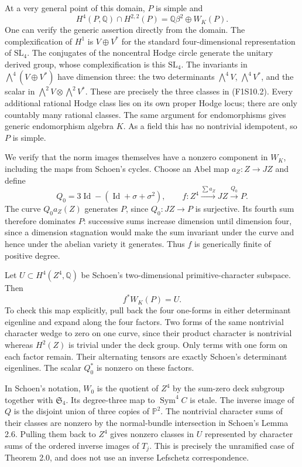 At a very general point of this domain, $P$ is simple and
\[
 H^4(P,\mathbb Q)\cap H^{2,2}(P)
                     =\mathbb Q\beta^2\oplus W_K(P).
 \tag{F1S10.2}
\]
One can verify the generic assertion directly from the domain.
The complexification of $H^1$ is $V\oplus V^*$ for the standard
four-dimensional representation of $\mathrm{SL}_4$.
The conjugates of the noncentral Hodge circle generate the
unitary derived group, whose complexification is this
$\mathrm{SL}_4$. The invariants in
$\bigwedge^4(V\oplus V^*)$ have dimension three: the two
determinants $\bigwedge^4V$, $\bigwedge^4V^*$, and the scalar
in $\bigwedge^2V\otimes\bigwedge^2V^*$. These are precisely
the three classes in (F1S10.2). Every additional rational
Hodge class lies on its own proper Hodge locus; there are
only countably many rational classes. The same argument
for endomorphisms gives generic endomorphism algebra $K$.
As a field this has no nontrivial idempotent, so $P$ is simple.

We verify that the norm images themselves have a nonzero
component in $W_K$, including the maps from Schoen's cycles.
Choose an Abel map $a_Z:Z\to JZ$ and define
\[
 Q_0=3\operatorname{Id}-(\operatorname{Id}+\sigma+\sigma^2),
 \qquad
 f:Z^4\xrightarrow{\sum a_Z}JZ\xrightarrow{Q_0}P.
 \tag{F1S10.3}
\]
The curve $Q_0a_Z(Z)$ generates $P$, since $Q_0:JZ\to P$
is surjective. Its fourth sum therefore dominates $P$:
successive sums increase dimension until dimension four,
since a dimension stagnation would make the sum invariant
under the curve and hence under the abelian variety it
generates. Thus $f$ is generically finite of positive degree.

Let $U\subset H^4(Z^4,\mathbb Q)$ be Schoen's two-dimensional
primitive-character subspace. Then
\[
                         f^*W_K(P)=U.
 \tag{F1S10.4}
\]
To check this map explicitly, pull back the four one-forms
in either determinant eigenline and expand along the four
factors. Two forms of the same nontrivial character wedge
to zero on one curve, since their product character is
nontrivial whereas $H^2(Z)$ is trivial under the deck group.
Only terms with one form on each factor remain. Their
alternating tensors are exactly Schoen's determinant
eigenlines. The scalar $Q_0^*$ is nonzero on these factors.

In Schoen's notation, $W_0$ is the quotient of $Z^4$ by
the sum-zero deck subgroup together with $\mathfrak S_4$.
Its degree-three map to $\operatorname{Sym}^4C$ is etale.
The inverse image of $Q$ is the disjoint union of three
copies of $\mathbb P^2$. The nontrivial character sums
of their classes are nonzero by the normal-bundle
intersection in Schoen's Lemma 2.6. Pulling them back
to $Z^4$ gives nonzero classes in $U$ represented by
character sums of the ordered inverse images of $T_j$.
This is precisely the unramified case of Theorem 2.0,
and does not use an inverse Lefschetz correspondence.


